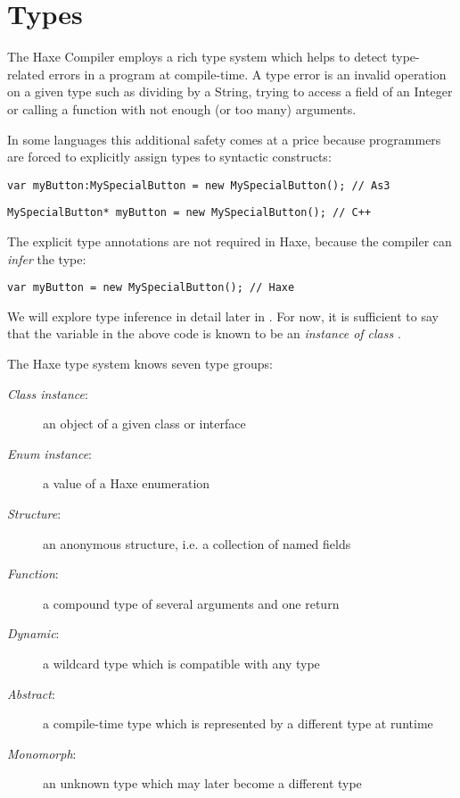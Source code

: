 \chapter{Types}
\label{types}

The Haxe Compiler employs a rich type system which helps to detect type-related errors in a program at compile-time. A type error is an invalid operation on a given type such as dividing by a String, trying to access a field of an Integer or calling a function with not enough (or too many) arguments.

In some languages this additional safety comes at a price because programmers are forced to explicitly assign types to syntactic constructs:

\begin{lstlisting}
var myButton:MySpecialButton = new MySpecialButton(); // As3
\end{lstlisting}
\begin{lstlisting}
MySpecialButton* myButton = new MySpecialButton(); // C++ 
\end{lstlisting}
The explicit type annotations are not required in Haxe, because the compiler can \emph{infer} the type:

\begin{lstlisting}
var myButton = new MySpecialButton(); // Haxe
\end{lstlisting}
We will explore type inference in detail later in . For now, it is sufficient to say that the variable  in the above code is known to be an \emph{instance of class} . 

The Haxe type system knows seven type groups:

\begin{description}
 \item[\emph{Class instance}:] an object of a given class or interface
 \item[\emph{Enum instance}:] a value of a Haxe enumeration
 \item[\emph{Structure}:] an anonymous structure, i.e. a collection of named fields
 \item[\emph{Function}:] a compound type of several arguments and one return
 \item[\emph{Dynamic}:] a wildcard type which is compatible with any type
 \item[\emph{Abstract}:] a compile-time type which is represented by a different type at runtime
 \item[\emph{Monomorph}:] an unknown type which may later become a different type
\end{description}

